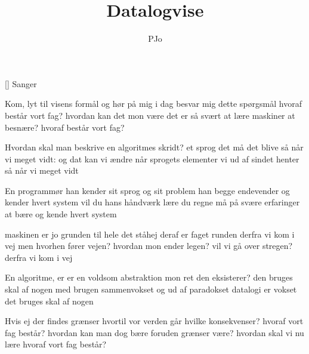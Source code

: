 \documentclass[a4paper,11pt]{article}
\title{Datalogvise}
\author{PJo}
\begin{document}
\maketitle

\begin{roles}
[] Sanger
\end{roles}


\begin{song}
Kom, lyt til visens formål
og hør på mig i dag
besvar mig dette spørgsmål
hvoraf består vort fag?
hvordan kan det mon være
det er så svært at lære
maskiner at besnære?
hvoraf består vort fag?

Hvordan skal man beskrive
en algoritmes skridt?
et sprog det må det blive
så når vi meget vidt:
og dat kan vi ændre
når sprogets elementer
vi ud af sindet henter
så når vi meget vidt

En programmør han kender
sit sprog og sit problem
han begge endevender
og kender hvert system
vil du hans håndværk lære
du regne må på svære
erfaringer at bære
og kende hvert system

maskinen er jo grunden
til hele det ståhej
deraf er faget runden
derfra vi kom i vej
men hvorhen fører vejen?
hvordan mon ender legen?
vil vi gå over stregen?
derfra vi kom i vej

En algoritme, er er
en voldsom abstraktion
mon ret den eksisterer?
den bruges skal af nogen
med brugen sammenvokset
og ud af paradokset
datalogi er vokset
det bruges skal af nogen

Hvis ej der findes grænser
hvortil vor verden går
hvilke konsekvenser?
hvoraf vort fag består?
hvordan kan man dog bære
foruden grænser være?
hvordan skal vi nu lære
hvoraf vort fag består?
\end{song}
\end{document}

